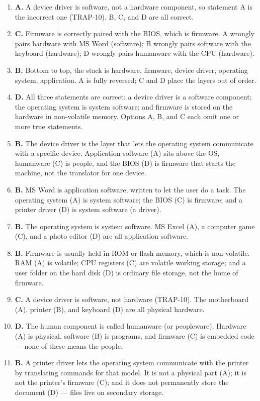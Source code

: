 \documentclass[11pt]{article}
\begin{document}
\begin{enumerate}[label=\textbf{Q\arabic*.}, leftmargin=*]
  computer system. The physical parts are hardware (A); stored programs are
  software (B); and startup code in ROM is firmware (D).
\item \textbf{A.} A device driver is software, not a hardware component, so
  statement A is the incorrect one (TRAP-10). B, C, and D are all correct.
\item \textbf{C.} Firmware is correctly paired with the BIOS, which is
  firmware. A wrongly pairs hardware with MS Word (software); B wrongly pairs
  software with the keyboard (hardware); D wrongly pairs humanware with the
  CPU (hardware).
\item \textbf{B.} Bottom to top, the stack is hardware, firmware, device
  driver, operating system, application. A is fully reversed; C and D place
  the layers out of order.
\item \textbf{D.} All three statements are correct: a device driver is a
  software component; the operating system is system software; and firmware
  is stored on the hardware in non-volatile memory. Options A, B, and C each
  omit one or more true statements.
\item \textbf{B.} The device driver is the layer that lets the operating
  system communicate with a specific device. Application software (A) sits
  above the OS, humanware (C) is people, and the BIOS (D) is firmware that
  starts the machine, not the translator for one device.
\item \textbf{B.} MS Word is application software, written to let the user do
  a task. The operating system (A) is system software; the BIOS (C) is
  firmware; and a printer driver (D) is system software (a driver).
\item \textbf{B.} The operating system is system software. MS Excel (A), a
  computer game (C), and a photo editor (D) are all application software.
\item \textbf{B.} Firmware is usually held in ROM or flash memory, which is
  non-volatile. RAM (A) is volatile; CPU registers (C) are volatile working
  storage; and a user folder on the hard disk (D) is ordinary file storage,
  not the home of firmware.
\item \textbf{C.} A device driver is software, not hardware (TRAP-10). The
  motherboard (A), printer (B), and keyboard (D) are all physical hardware.
\item \textbf{D.} The human component is called humanware (or peopleware).
  Hardware (A) is physical, software (B) is programs, and firmware (C) is
  embedded code --- none of these means the people.
\item \textbf{B.} A printer driver lets the operating system communicate with
  the printer by translating commands for that model. It is not a physical
  part (A); it is not the printer's firmware (C); and it does not permanently
  store the document (D) --- files live on secondary storage.


\end{enumerate}
\end{document}
